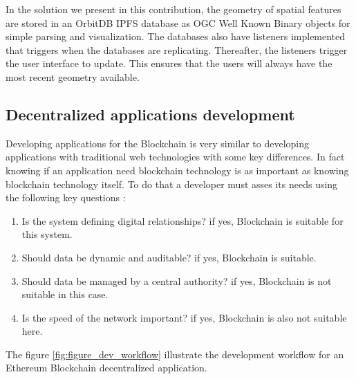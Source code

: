 \documentclass{isprs} %
\begin{document}
In the solution we present in this contribution, the geometry of spatial features are stored in an OrbitDB IPFS database as OGC Well Known Binary objects for simple parsing and visualization. The databases also have listeners implemented that triggers when the databases are replicating. Thereafter, the listeners trigger the user interface to update. This ensures that the users will always have the most recent geometry available.

\subsection{Decentralized applications development}\label{sec:Decentralized applications developement}

Developing applications for the Blockchain is very similar to developing applications with traditional web technologies with some key differences. In fact knowing if an application need blockchain technology is as important as knowing blockchain technology itself. To do that a developer must asses its needs using the following key questions :

\begin{enumerate}
\setlength\itemsep{0em}\setlength\parskip{0em}\setlength\topsep{0em}\setlength\partopsep{0em}\setlength\parsep{0em} 
\item{Is the system defining digital relationships? if yes, Blockchain is suitable for this system.} 
\item{Should data be dynamic and auditable? if yes, Blockchain is suitable.}
\item{Should data be managed by a central authority? if yes, Blockchain is not suitable in this case.}
\item{Is the speed of the network important? if yes, Blockchain is also not suitable here.}
\end{enumerate}

The figure \ref{fig:figure_dev_workflow} illustrate the development workflow for an Ethereum Blockchain decentralized application.
\end{document}
